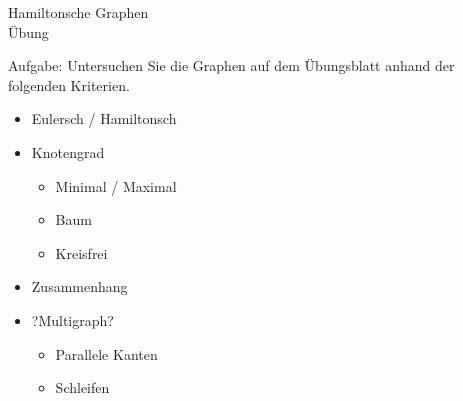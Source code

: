 \documentclass{beamer}
\begin{document}
%
% 
%
\begin{frame}{Hamiltonsche Graphen\\\normalsize{Übung}}
\begin{block}{Aufgabe:}
	Untersuchen Sie die Graphen auf dem Übungsblatt anhand der folgenden Kriterien.
\end{block}
\begin{itemize}
	\item Eulersch / Hamiltonsch
	\item Knotengrad
	\begin{itemize}
		\item Minimal / Maximal
		\item Baum
		\item Kreisfrei
	\end{itemize}
	\item Zusammenhang
	\item ?Multigraph?
	\begin{itemize}
		\item Parallele Kanten
		\item Schleifen
	\end{itemize}
\end{itemize}
\end{frame}
\end{document}
